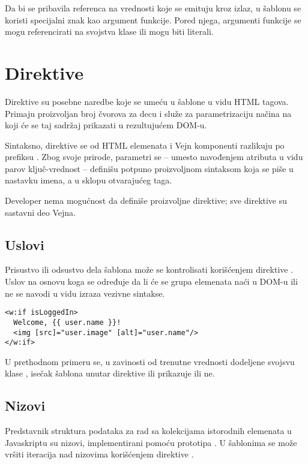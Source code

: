 Da bi se pribavila referenca na vrednosti koje se emituju kroz izlaz, u šablonu se koristi specijalni znak \code{\#} kao argument funkcije.
Pored njega, argumenti funkcije se mogu referencirati na svojstva klase ili mogu biti literali.

\section{Direktive}

Direktive su posebne naredbe koje se umeću u šablone u vidu HTML tagova.
Primaju proizvoljan broj čvorova za decu i služe za parametrizaciju načina na koji će se taj sadržaj prikazati u rezultujućem DOM-u.

Sintaksno, direktive se od HTML elemenata i Vejn komponenti razlikuju po prefiksu .
Zbog svoje prirode, parametri se -- umesto navođenjem atributa u vidu parov ključ-vrednost -- definišu potpuno proizvoljnom sintaksom koja se piše u nastavku imena, a u sklopu otvarajućeg taga.

Developer nema mogućnost da definiše proizvoljne direktive; sve direktive su sastavni deo Vejna.

\subsection{Uslovi}

Prisustvo ili odsustvo dela šablona može se kontrolisati korišćenjem direktive .
Uslov na osnovu koga se određuje da li će se grupa elemenata naći u DOM-u ili ne se navodi u vidu izraza vezivne sintakse.

\begin{verbatim}
<w:if isLoggedIn>
  Welcome, {{ user.name }}!
  <img [src]="user.image" [alt]="user.name"/>
</w:if>
\end{verbatim}

U prethodnom primeru se, u zavinosti od trenutne vrednosti dodeljene svojsvu klase , isečak šablona unutar direktive  ili prikazuje ili ne.

\subsection{Nizovi}

Predstavnik struktura podataka za rad sa kolekcijama istorodnih elemenata u Javaskriptu su nizovi, implementirani pomoću prototipa .
U šablonima se može vršiti iteracija nad nizovima korišćenjem direktive .

